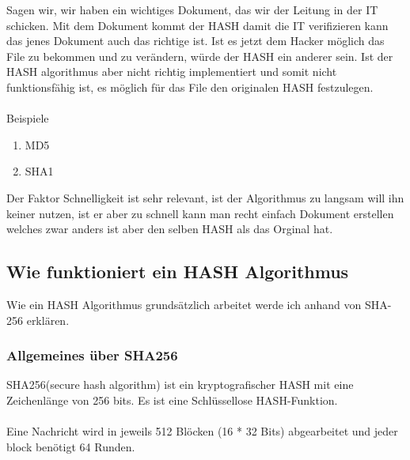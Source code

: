 {Sagen wir, wir haben ein wichtiges Dokument, das wir der Leitung in der IT schicken. Mit dem Dokument kommt der HASH damit die IT verifizieren kann das jenes Dokument auch das richtige ist. Ist es jetzt dem Hacker möglich das File zu bekommen und zu verändern, würde der HASH ein anderer sein. Ist der HASH algorithmus aber nicht richtig implementiert und somit nicht funktionsfähig ist, es möglich für das File den originalen HASH festzulegen.
\\ \\
Beispiele
\begin{enumerate}
\item MD5
\item SHA1
\end{enumerate}
Der Faktor Schnelligkeit ist sehr relevant, ist der Algorithmus zu langsam will ihn keiner nutzen, ist er aber zu schnell kann man recht einfach Dokument erstellen welches zwar anders ist aber den selben HASH als das Orginal hat.
\subsection{Wie funktioniert ein HASH Algorithmus}
Wie ein HASH Algorithmus grundsätzlich arbeitet werde ich anhand von SHA-256 erklären. 
\subsubsection{Allgemeines über SHA256}
SHA256(secure hash algorithm) ist ein kryptografischer HASH mit eine Zeichenlänge von 256 bits. Es ist eine Schlüssellose HASH-Funktion.
\\ \\
Eine Nachricht wird in jeweils 512 Blöcken (16 * 32 Bits) abgearbeitet und jeder block benötigt 64 Runden.
}
